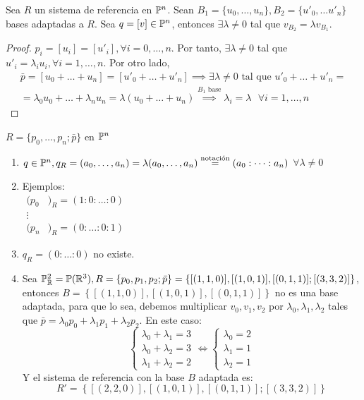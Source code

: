 \begin{prop}
    Sea $R$ un sistema de referencia en $\mathbb{P}^n$. Sean $B_1 = \{ u_0, \dots, u_n\}, B_2 = \{ u'_0, \dots u'_n \}$ bases adaptadas a $R$. Sea $q = [v] \in \mathbb{P}^n$,
    entonces $\exists \lambda \neq 0$ tal que $v_{B_2} = \lambda v_{B_1}$.
\end{prop}
\begin{proof}
    $p_i = [u_i] = [u'_i], \forall i = 0, \dots, n$. Por tanto, $\exists \lambda \neq 0$ tal que $u'_i= \lambda_i u_i, \forall i = 1, \dots, n$. Por otro lado,
    \begin{gather*}
        \bar{p} = [u_0 + \dots + u_n] = [u'_0 + \dots + u'_n] \implies \exists \lambda \neq 0 \text{ tal que } u'_0 + \dots + u'_n = \\ = \lambda_0 u_0 + \dots + \lambda_n u_n = \lambda (u_0 + \dots + u_n)
        \stackrel{B_1 \text{ base}}{\implies} \lambda_i = \lambda \text{ } \forall i = 1, \dots, n
    \end{gather*}
\end{proof}
\begin{obs}
    $R = \{ p_0, \dots, p_n; \bar{p} \}$ en $\mathbb{P}^n$
    \begin{enumerate}
        \item $q \in \mathbb{P}^n, q_R = (a_0, \dots, a_n) = \lambda (a_0, \dots, a_n) \stackrel{\text{notación}}{=} (a_0 : \dots : a_n)$ $\forall \lambda \neq 0$
        \item Ejemplos: \\ $\begin{aligned} (p_0&)_R = (1:0:\dots:0) \\ \vdots& \\ (p_n&)_R = (0:\dots:0:1) \end{aligned}$
        \item $q_R = (0: \dots : 0)$ no existe.
        \item Sea $\mathbb{P}^2_{\mathbb{R}} = \mathbb{P}(\mathbb{R}^3), R = \{ p_0, p_1, p_2; \bar{p} \} = \left\{ [(1,1,0)], [(1,0,1)], [(0,1,1)]; [(3,3,2)]\right\}$, entonces $B = \left\{ [(1,1,0)], [(1,0,1)], [(0,1,1)] \right\}$ no es una base
            adaptada, para que lo sea, debemos multiplicar $v_0, v_1, v_2$ por $\lambda_0, \lambda_1, \lambda_2$ tales que $\bar{p} = \lambda_0 p_0 + \lambda_1 p_1 + \lambda_2 p_2$. En este caso:
            \[
                \begin{cases} \lambda_0 + \lambda_1 = 3 \\ \lambda_0 + \lambda_2 = 3 \\ \lambda_1 + \lambda_2 = 2 \end{cases} \iff \begin{cases} \lambda_0 = 2 \\ \lambda_1 = 1 \\ \lambda_2 = 1 \end{cases}
            \]
            Y el sistema de referencia con la base $B$ adaptada es: \[ R' = \left\{ [(2,2,0)], [(1,0,1)], [(0,1,1)]; [(3,3,2)]\right\} \]
    \end{enumerate}
\end{obs}


